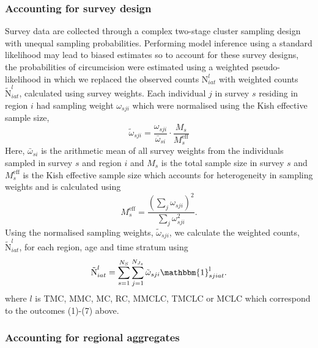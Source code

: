 \documentclass{article}
\begin{document}
\begin{appendix}
\subsubsection{Accounting for survey design}


\noindent Survey data are collected through a complex two-stage cluster sampling design with unequal sampling probabilities. Performing model inference using a standard likelihood may lead to biased estimates so to account for these survey designs, the probabilities of circumcision were estimated using a weighted pseudo-likelihood in which we replaced the observed counts $\text{N}^l_{iat}$ with weighted counts $\tilde{\text{N}}^l_{iat}$, calculated using survey weights. Each individual $j$ in survey $s$ residing in region $i$ had sampling weight $\omega_{sji}$ which were normalised using the Kish effective sample size, 
\begin{equation*}
	\tilde\omega_{sji} = \frac{\omega_{sji}}{\bar{\omega}_{si}}\cdot \frac{M_s}{M^{\text{eff}}_s} 
\end{equation*}
Here, $\bar{\omega}_{si}$ is the arithmetic mean of all survey weights from the individuals sampled in survey $s$ and region $i$ and $M_s$ is the total sample size in survey $s$ and $M^{\text{eff}}_s$ is the Kish effective sample size which accounts for heterogeneity in sampling weights and is calculated using 
\begin{equation*}
	M^{\text{eff}}_s = \frac{(\sum_j \omega_{sji})^2}{\sum_j \omega_{sji}^{2}}.
\end{equation*}
Using the normalised sampling weights, $\tilde\omega_{sji}$, we calculate the weighted counts, $\tilde{\text{N}}^l_{iat}$, for each region, age and time stratum using 
\begin{equation*}
	\tilde{\text{N}}^{l}_{iat} = \sum_{s=1}^{N_S}\sum_{j=1}^{N_{J_s}}\tilde\omega_{sji} \mathbbm{1}^{\text{l}}_{sjiat}.
\end{equation*}
where $l$ is TMC, MMC, MC, RC, MMCLC, TMCLC or MCLC which correspond to the outcomes (1)-(7) above. 


\subsubsection{Accounting for regional aggregates}



\end{appendix}
\end{document}
